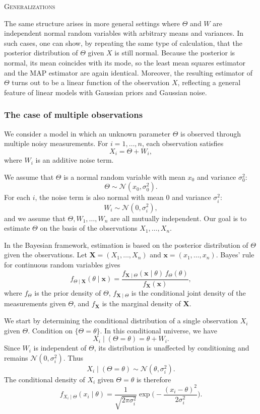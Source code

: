 \bigskip
\textsc{Generalizations}

The same structure arises in more general settings where \(\Theta\) and \(W\) are independent normal random variables with arbitrary means and variances.  
In such cases, one can show, by repeating the same type of calculation, that the posterior distribution of \(\Theta\) given \(X\) is still normal.  
Because the posterior is normal, its mean coincides with its mode, so the least mean squares estimator and the MAP estimator are again identical.  
Moreover, the resulting estimator of \(\Theta\) turns out to be a linear function of the observation \(X\), reflecting a general feature of linear models with Gaussian priors and Gaussian noise.



\subsubsection{The case of multiple observations}

We consider a model in which an unknown parameter \(\Theta\) is observed through multiple noisy measurements.  
For \(i = 1,\dots,n\), each observation satisfies
\[
X_i
=
\Theta + W_i,
\]
where \(W_i\) is an additive noise term.

We assume that \(\Theta\) is a normal random variable with mean \(x_0\) and variance \(\sigma_{0}^{2}\):
\[
\Theta \sim \mathcal{N}(x_0,\sigma_{0}^{2}).
\]
For each \(i\), the noise term is also normal with mean \(0\) and variance \(\sigma_{i}^{2}\):
\[
W_i \sim \mathcal{N}(0,\sigma_{i}^{2}),
\]
and we assume that \(\Theta,W_1,\dots,W_n\) are all mutually independent.  
Our goal is to estimate \(\Theta\) on the basis of the observations \(X_1,\dots,X_n\).

In the Bayesian framework, estimation is based on the posterior distribution of \(\Theta\) given the observations.  
Let \(\mathbf{X} = (X_1,\dots,X_n)\) and \(\mathbf{x} = (x_1,\dots,x_n)\).  
Bayes' rule for continuous random variables gives
\[
f_{\Theta\mid \mathbf{X}}(\theta\mid \mathbf{x})
=
\frac{f_{\mathbf{X}\mid\Theta}(\mathbf{x}\mid\theta)\,f_{\Theta}(\theta)}{f_{\mathbf{X}}(\mathbf{x})},
\]
where \(f_{\Theta}\) is the prior density of \(\Theta\), \(f_{\mathbf{X}\mid\Theta}\) is the conditional joint density of the measurements given \(\Theta\), and \(f_{\mathbf{X}}\) is the marginal density of \(\mathbf{X}\).

We start by determining the conditional distribution of a single observation \(X_i\) given \(\Theta\).  
Condition on \(\{\Theta = \theta\}\).  
In this conditional universe, we have
\[
X_i \mid (\Theta = \theta)
=
\theta + W_i.
\]
Since \(W_i\) is independent of \(\Theta\), its distribution is unaffected by conditioning and remains \(\mathcal{N}(0,\sigma_{i}^{2})\).  
Thus
\[
X_i \mid (\Theta = \theta)
\sim
\mathcal{N}(\theta,\sigma_{i}^{2}).
\]
The conditional density of \(X_i\) given \(\Theta = \theta\) is therefore
\[
f_{X_i\mid\Theta}(x_i\mid\theta)
=
\frac{1}{\sqrt{2\pi\sigma_{i}^{2}}}
\exp\Big(-\frac{(x_i-\theta)^{2}}{2\sigma_{i}^{2}}\Big).
\]

